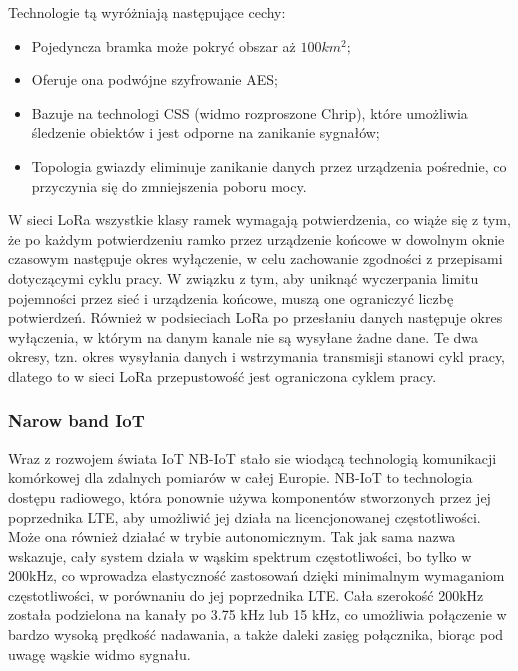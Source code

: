 \hspace{1cm}Technologie tą wyróżniają następujące cechy:
\begin{itemize}
  \item Pojedyncza bramka może pokryć obszar aż $100km^2$;
  \item Oferuje ona podwójne szyfrowanie AES;
  \item Bazuje na technologi CSS (widmo rozproszone Chrip), które umożliwia śledzenie obiektów i jest odporne na zanikanie sygnałów;
  \item Topologia gwiazdy eliminuje zanikanie danych przez urządzenia pośrednie, co przyczynia się do zmniejszenia poboru mocy. \cite{LoRa-article}
\end{itemize}


\hspace{1cm}W sieci LoRa wszystkie klasy ramek wymagają potwierdzenia, co wiąże się z tym, że po każdym potwierdzeniu ramko przez urządzenie końcowe w dowolnym oknie czasowym następuje okres wyłączenie, w celu zachowanie zgodności z przepisami dotyczącymi cyklu pracy. W związku z tym, aby uniknąć wyczerpania limitu pojemności przez sieć i urządzenia końcowe, muszą one ograniczyć liczbę potwierdzeń. Również w podsieciach LoRa po przesłaniu danych następuje okres wyłączenia, w którym na danym kanale nie są wysyłane żadne dane. Te dwa okresy, tzn. okres wysyłania danych i wstrzymania transmisji stanowi cykl pracy, dlatego  to w sieci LoRa przepustowość jest ograniczona cyklem pracy.\cite{LoRa-article}

\subsubsection{Narow band IoT}
\hspace{1cm}Wraz z rozwojem świata IoT NB-IoT stało sie wiodącą technologią komunikacji komórkowej dla zdalnych pomiarów w całej Europie. NB-IoT to technologia dostępu radiowego, która ponownie używa komponentów stworzonych przez jej poprzednika LTE, aby umożliwić jej działa na licencjonowanej częstotliwości. Może ona również działać w trybie autonomicznym. Tak jak sama nazwa wskazuje, cały system działa w wąskim spektrum częstotliwości, bo tylko w 200kHz, co wprowadza elastyczność zastosowań dzięki minimalnym wymaganiom częstotliwości, w porównaniu do jej poprzednika LTE. Cała szerokość 200kHz została podzielona na kanały po 3.75 kHz lub 15 kHz, co umożliwia połączenie w bardzo wysoką prędkość nadawania, a także daleki zasięg połącznika, biorąc pod uwagę wąskie widmo sygnału. \cite{nbiot-article}  

